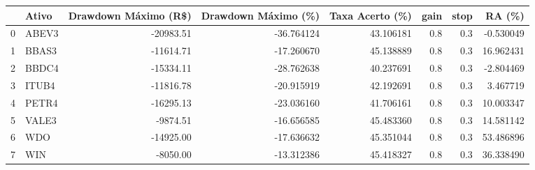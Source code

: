\begin{tabular}{llrrrrrr}
\toprule
{} & Ativo &  Drawdown Máximo (R\$) &  Drawdown Máximo (\%)  &       Taxa Acerto (\%) &  gain &  stop &  RA (\%) \\
\midrule
0 &      ABEV3 &         -20983.51 &                   -36.764124 &  43.106181 &   0.8 &   0.3 &           -0.530049 \\
1 &      BBAS3 &         -11614.71 &                   -17.260670 &  45.138889 &   0.8 &   0.3 &           16.962431 \\
2 &      BBDC4 &         -15334.11 &                   -28.762638 &  40.237691 &   0.8 &   0.3 &           -2.804469 \\
3 &      ITUB4 &         -11816.78 &                   -20.915919 &  42.192691 &   0.8 &   0.3 &            3.467719 \\
4 &      PETR4 &         -16295.13 &                   -23.036160 &  41.706161 &   0.8 &   0.3 &           10.003347 \\
5 &      VALE3 &          -9874.51 &                   -16.656585 &  45.483360 &   0.8 &   0.3 &           14.581142 \\
6 &        WDO &         -14925.00 &                   -17.636632 &  45.351044 &   0.8 &   0.3 &           53.486896 \\
7 &        WIN &          -8050.00 &                   -13.312386 &  45.418327 &   0.8 &   0.3 &           36.338490 \\
\bottomrule
\end{tabular}

